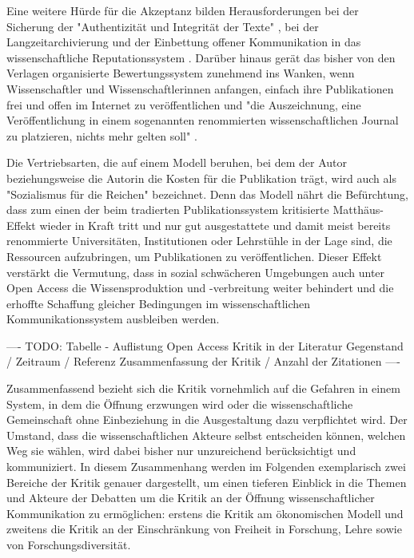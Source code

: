 Eine weitere Hürde für die Akzeptanz bilden Herausforderungen bei der Sicherung der "Authentizität und Integrität der Texte" \cite{Weishaupt_2009} \cite[:191]{Fehling_2014}, bei der Langzeitarchivierung \cite{Hagner_2015} \cite{Martin_2013} und der Einbettung offener Kommunikation in das wissenschaftliche Reputationssystem \cite{Weishaupt_2009} \cite{Suber_2002} \cite{Adema_2014}. Darüber hinaus gerät das bisher von den Verlagen organisierte Bewertungssystem zunehmend ins Wanken, wenn Wissenschaftler und Wissenschaftlerinnen anfangen, einfach ihre Publikationen frei und offen im Internet zu veröffentlichen und "die Auszeichnung, eine Veröffentlichung in einem sogenannten renommierten wissenschaftlichen Journal zu platzieren, nichts mehr gelten soll" \cite{Schirmbacher_2007}.

Die Vertriebsarten, die auf einem Modell beruhen, bei dem der Autor beziehungsweise die Autorin die Kosten für die Publikation trägt, wird auch als "Sozialismus für die Reichen" \cite{Cope_2014} bezeichnet. Denn das Modell nährt die Befürchtung, dass zum einen der beim tradierten Publikationssystem kritisierte Matthäus-Effekt wieder in Kraft tritt und nur gut ausgestattete und damit meist bereits renommierte Universitäten, Institutionen oder Lehrstühle in der Lage sind, die Ressourcen aufzubringen, um Publikationen zu veröffentlichen. Dieser Effekt verstärkt die Vermutung, dass in sozial schwächeren Umgebungen auch unter Open Access die Wissensproduktion und -verbreitung weiter behindert und die erhoffte Schaffung gleicher Bedingungen im wissenschaftlichen Kommunikationssystem ausbleiben werden.

---- TODO: Tabelle - Auflistung Open Access Kritik in der Literatur Gegenstand / Zeitraum / Referenz Zusammenfassung der Kritik / Anzahl der Zitationen ----

Zusammenfassend bezieht sich die Kritik vornehmlich auf die Gefahren in einem System, in dem die Öffnung erzwungen wird oder die wissenschaftliche Gemeinschaft ohne Einbeziehung in die Ausgestaltung dazu verpflichtet wird. Der Umstand, dass die wissenschaftlichen Akteure selbst entscheiden können, welchen Weg sie wählen, wird dabei bisher nur unzureichend berücksichtigt und kommuniziert. In diesem Zusammenhang werden im Folgenden exemplarisch zwei Bereiche der Kritik genauer dargestellt, um einen tieferen Einblick in die Themen und Akteure der Debatten um die Kritik an der Öffnung wissenschaftlicher Kommunikation zu ermöglichen: erstens die Kritik am ökonomischen Modell und zweitens die Kritik an der Einschränkung von Freiheit in Forschung, Lehre sowie von Forschungsdiversität.

